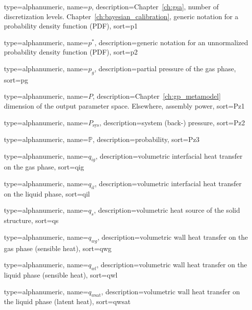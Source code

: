 {
  type=alphanumeric,
	name={\ensuremath{p}},
	description={Chapter~\ref{ch:gsa}, number of discretization levels. \newline Chapter~\ref{ch:bayesian_calibration}, generic notation for a probability density function (PDF)},
	sort={p1}
}

{
  type=alphanumeric,
	name={\ensuremath{p^*}},
	description={generic notation for an unnormalized probability density function (PDF)},
	sort={p2}
}

{
  type=alphanumeric,
	name={\ensuremath{p_g}},
	description={partial pressure of the gas phase},
	sort={pg}
}

{
  type=alphanumeric,
	name={\ensuremath{P}},
	description={Chapter~\ref{ch:gp_metamodel} dimension of the output parameter space. \newline Elsewhere, assembly power},
	sort={Pz1}
}

{
  type=alphanumeric,
	name={\ensuremath{P_\text{sys}}},
	description={system (back-) pressure},
	sort={Pz2}
}

{
  type=alphanumeric,
	name={\ensuremath{\mathbb{P}}},
	description={probability},
	sort={Pz3}
}

{
  type=alphanumeric,
	name={\ensuremath{q_{ig}}},
	description={volumetric interfacial heat transfer on the gas phase},
	sort={qig}
}

{
  type=alphanumeric,
	name={\ensuremath{q_{il}}},
	description={volumetric interfacial heat transfer on the liquid phase},
	sort={qil}
}

{
  type=alphanumeric,
	name={\ensuremath{q_s}},
	description={volumetric heat source of the solid structure},
	sort={qs}
}

{
  type=alphanumeric,
	name={\ensuremath{q_{wg}}},
	description={volumetric wall heat transfer on the gas phase (sensible heat)},
	sort={qwg}
}

{
  type=alphanumeric,
	name={\ensuremath{q_{wl}}},
	description={volumetric wall heat transfer on the liquid phase (sensible heat)},
	sort={qwl}
}

{
  type=alphanumeric,
	name={\ensuremath{q_{w\text{sat}}}},
	description={volumetric wall heat transfer on the liquid phase (latent heat)},
	sort={qwsat}
}

